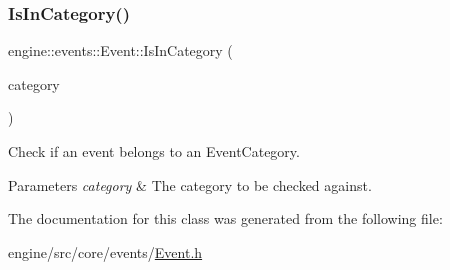 \subsubsection{\texorpdfstring{Is\+In\+Category()}{IsInCategory()}}
{\footnotesize\ttfamily engine\+::events\+::\+Event\+::\+Is\+In\+Category (\begin{DoxyParamCaption}\item[{\hyperlink{Event_8h_a1e3bf91397b8a47069494aede2669474}{Event\+Category}}]{category }\end{DoxyParamCaption})\hspace{0.3cm}{\ttfamily [inline]}}



Check if an event belongs to an Event\+Category. 


\begin{DoxyParams}{Parameters}
{\em category} & The category to be checked against. \\
\hline
\end{DoxyParams}


The documentation for this class was generated from the following file\+:\begin{DoxyCompactItemize}
\item 
engine/src/core/events/\hyperlink{Event_8h}{Event.\+h}\end{DoxyCompactItemize}
